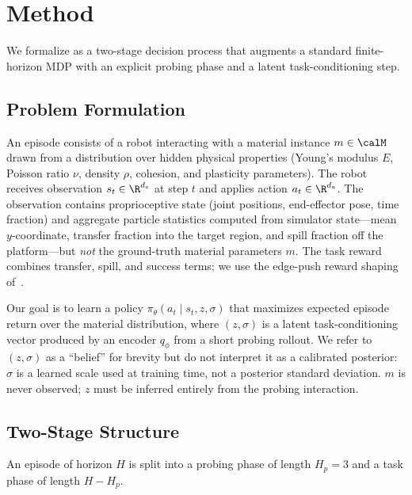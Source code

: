 \section{Method}
\label{sec:method}

We formalize \PTA{} as a two-stage decision process that augments a standard finite-horizon MDP with an explicit probing phase and a latent task-conditioning step.

\subsection{Problem Formulation}

An episode consists of a robot interacting with a material instance $m \in \calM$ drawn from a distribution over hidden physical properties (Young's modulus $E$, Poisson ratio $\nu$, density $\rho$, cohesion, and plasticity parameters). The robot receives observation $s_t \in \R^{d_s}$ at step $t$ and applies action $a_t \in \R^{d_a}$. The observation contains proprioceptive state (joint positions, end-effector pose, time fraction) and aggregate particle statistics computed from simulator state---mean $y$-coordinate, transfer fraction into the target region, and spill fraction off the platform---but \emph{not} the ground-truth material parameters $m$. The task reward combines transfer, spill, and success terms; we use the edge-push reward shaping of~\cite{genesis2024}.

Our goal is to learn a policy $\pi_\theta(a_t \mid s_t, z, \sigma)$ that maximizes expected episode return over the material distribution, where $(z, \sigma)$ is a latent task-conditioning vector produced by an encoder $q_\phi$ from a short probing rollout. We refer to $(z, \sigma)$ as a ``belief'' for brevity but do not interpret it as a calibrated posterior: $\sigma$ is a learned scale used at training time, not a posterior standard deviation. $m$ is never observed; $z$ must be inferred entirely from the probing interaction.

\subsection{Two-Stage Structure}

An episode of horizon $H$ is split into a probing phase of length $H_p = 3$ and a task phase of length $H - H_p$.

